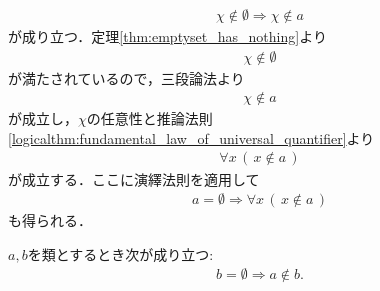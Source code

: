 \begin{prf}
		\begin{align}
			\chi \notin \emptyset \Longrightarrow \chi \notin a
		\end{align}
		が成り立つ．定理\ref{thm:emptyset_has_nothing}より
		\begin{align}
			\chi \notin \emptyset
		\end{align}
		が満たされているので，三段論法より
		\begin{align}
			\chi \notin a
		\end{align}
		が成立し，$\chi$の任意性と推論法則\ref{logicalthm:fundamental_law_of_universal_quantifier}より
		\begin{align}
			\forall x\, (\, x \notin a\, )
		\end{align}
		が成立する．ここに演繹法則を適用して
		\begin{align}
			a = \emptyset \Longrightarrow \forall x\, (\, x \notin a\, )
		\end{align}
		も得られる．
		\QED
	\end{prf}
	
	\begin{screen}
		\begin{thm}[空集合はいかなる類も要素に持たない]
		\label{thm:emptyset_does_not_contain_any_class}
			$a,b$を類とするとき次が成り立つ:
			\begin{align}
				b = \emptyset \Longrightarrow a \notin b.
			\end{align}
		\end{thm}
	\end{screen}
	
